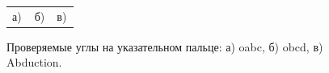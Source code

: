 \begin{figure}[H]
\begin{minipage}[h]{0.32\linewidth}
\end{minipage}
\begin{minipage}[h]{1\linewidth}
\begin{tabular}{p{0.32\linewidth}p{0.32\linewidth}p{0.32\linewidth}}
\centering а) & \centering б) & \centering в) \\
\end{tabular}
\end{minipage}
\vspace*{-1cm}
\caption{Проверяемые углы на указательном пальце: а) oabc, б) obcd, в) Abduction.}
\label{fig:finger_motion_type_2}
\end{figure}

\begin{figure}[H]
\begin{minipage}[h]{0.32\linewidth}
\end{minipage}
\hfill
\begin{minipage}[h]{0.32\linewidth}

\end{minipage}
\end{figure}
